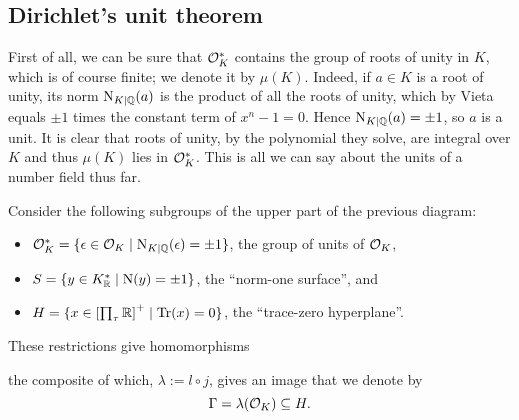 \begin{center}
\end{center}

\subsection{Dirichlet's unit theorem}

First of all, we can be sure that $\mathcal{O}^*_K$ contains the group of roots of unity in $K$, which is of course finite; we denote it by $\mu(K)$. Indeed, if $a\in K$ is a root of unity, its norm $\operatorname{N}_{K\mid\mathbb{Q}}(a)$ is the product of all the roots of unity, which by Vieta equals $\pm 1$ times the constant term of $x^n-1=0$. Hence $\operatorname{N}_{K\mid\mathbb{Q}}(a)=\pm 1$, so $a$ is a unit. It is clear that roots of unity, by the polynomial they solve, are integral over $K$ and thus $\mu(K)$ lies in $\mathcal{O}^*_K$. This is all we can say about the units of a number field thus far.

Consider the following subgroups of the upper part of the previous diagram:
\begin{itemize}
	\item $\mathcal{O}^*_K = \{\epsilon\in\mathcal{O}_K \mid \operatorname{N}_{K\mid\mathbb{Q}}(\epsilon) = \pm 1\}$, the group of units of $\mathcal{O}_K$,
	\item $S=\{y\in K^*_{\mathbb{R}} \mid \operatorname{N}(y)=\pm 1\}$, the ``norm-one surface'', and
	\item $H=\{x\in\left[\prod_\tau\mathbb{R}\right]^+ \mid \operatorname{Tr}(x)=0\}$, the ``trace-zero hyperplane''.
\end{itemize}

These restrictions give homomorphisms
\begin{center}
\end{center}
the composite of which, $\lambda := l\circ j$, gives an image that we denote by
\[
	\Gamma = \lambda(\mathcal{O}_K) \subseteq H.
\]

